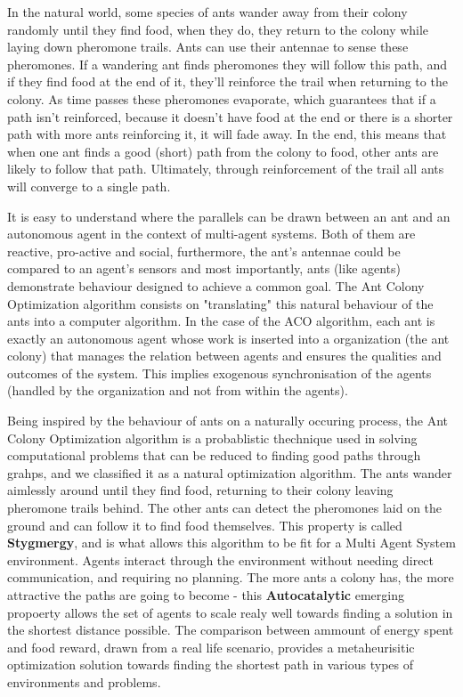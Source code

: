 \documentclass[times, 10pt,twocolumn]{article}
\begin{document}
        In the natural world, some species of ants wander away from their colony randomly until 
    they find food, when they do, they return to the colony while laying down pheromone trails.
    Ants can use their antennae to sense these pheromones. If a wandering ant finds pheromones
    they will follow this path, and if they find food at the end of it, they'll reinforce the 
    trail when returning to the colony. As time passes these pheromones evaporate, which 
    guarantees that if a path isn't reinforced, because it doesn't have food at the end or there
    is a shorter path with more ants reinforcing it, it will fade away. In the end, this 
    means that when one ant finds a good (short) path from the colony to food, other ants are
    likely to follow that path. Ultimately, through reinforcement of the trail all ants will
    converge to a single path.
	
	    It is easy to understand where the parallels can be drawn between an ant and an autonomous 
    agent in the context of multi-agent systems. Both of them are reactive, pro-active and
    social, furthermore, the ant's antennae could be compared to an agent's sensors and 
    most importantly, ants (like agents) demonstrate behaviour designed to achieve a common goal. 
    The Ant Colony Optimization algorithm consists on "translating" this natural behaviour
    of the ants into a computer algorithm. In the case of the ACO algorithm, each ant is 
    exactly an autonomous agent whose work is inserted into a organization (the ant colony) 
    that manages the relation between agents and ensures the qualities and outcomes of the 
    system. This implies exogenous synchronisation of the agents (handled by the organization 
    and not from within the agents).
	

	

Being inspired by the behaviour of ants on a naturally occuring process, the Ant Colony Optimization algorithm is a probablistic thechnique used in solving computational problems that can be reduced to finding good paths through grahps, and we classified it as a natural optimization algorithm. The ants wander aimlessly around until they find food, returning to their colony leaving pheromone trails behind. The other ants can detect the pheromones laid on the ground and can follow it to find food themselves. This property is called \textbf{Stygmergy}, and is what allows this algorithm to be fit for a Multi Agent System environment. Agents interact through the environment without needing direct communication, and requiring no planning. The more ants a colony has, the more attractive the paths are going to become - this \textbf{Autocatalytic} emerging propoerty allows the set of agents to scale realy well towards finding a solution in the shortest distance possible. The comparison between ammount of energy spent and food reward, drawn from a real life scenario, provides a metaheurisitic optimization solution towards finding the shortest path in various types of environments and problems.
	
\end{document}

